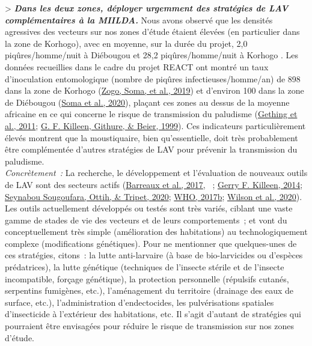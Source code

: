\documentclass[12pt,twoside]{reedthesis}
\begin{document}
\textgreater{} \textbf{\emph{Dans les deux zones, déployer urgemment des stratégies de LAV complémentaires à la MIILDA.}} Nous avons observé que les densités agressives des vecteurs sur nos zones d'étude étaient élevées (en particulier dans la zone de Korhogo), avec en moyenne, sur la durée du projet, 2,0 piqûres/homme/nuit à Diébougou et 28,2 piqûres/homme/nuit à Korhogo . Les données recueillies dans le cadre du projet REACT ont montré un taux d'inoculation entomologique (nombre de piqûres infectieuses/homme/an) de 898 dans la zone de Korhogo (\protect\hyperlink{ref-zogo_anopheles_2019}{Zogo, Soma, et al., 2019}) et d'environ 100 dans la zone de Diébougou (\protect\hyperlink{ref-soma_anopheles_2020}{Soma et al., 2020}), plaçant ces zones au dessus de la moyenne africaine en ce qui concerne le risque de transmission du paludisme (\protect\hyperlink{ref-gething_new_2011}{Gething et al., 2011}; \protect\hyperlink{ref-killeen_short_1999}{G. F. Killeen, Githure, \& Beier, 1999}). Ces indicateurs particulièrement élevés montrent que la moustiquaire, bien qu'essentielle, doit très probablement être complémentée d'autres stratégies de LAV pour prévenir la transmission du paludisme.\\

\emph{Concrètement~:} La recherche, le développement et l'évaluation de nouveaux outils de LAV sont des secteurs actifs (\protect\hyperlink{ref-barreaux_priorities_2017}{Barreaux et al., 2017}, ~; \protect\hyperlink{ref-killeen_characterizing_2014}{Gerry F. Killeen, 2014}; \protect\hyperlink{ref-sougoufara_need_2020}{Seynabou Sougoufara, Ottih, \& Tripet, 2020}; \protect\hyperlink{ref-who_2017_who_nodate}{WHO, 2017b}; \protect\hyperlink{ref-wilson_importance_2020}{Wilson et al., 2020}). Les outils actuellement développés ou testés sont très variés, ciblant une vaste gamme de stades de vie des vecteurs et de leurs comportements~; et vont du conceptuellement très simple (amélioration des habitations) au technologiquement complexe (modifications génétiques). Pour ne mentionner que quelques-unes de ces stratégies, citons~: la lutte anti-larvaire (à base de bio-larvicides ou d'espèces prédatrices), la lutte génétique (techniques de l'insecte stérile et de l'insecte incompatible, forçage génétique), la protection personnelle (répulsifs cutanés, serpentins fumigènes, etc.), l'aménagement du territoire (drainage des eaux de surface, etc.), l'administration d'endectocides, les pulvérisations spatiales d'insecticide à l'extérieur des habitations, etc. Il s'agit d'autant de stratégies qui pourraient être envisagées pour réduire le risque de transmission sur nos zones d'étude.\\
\end{document}

